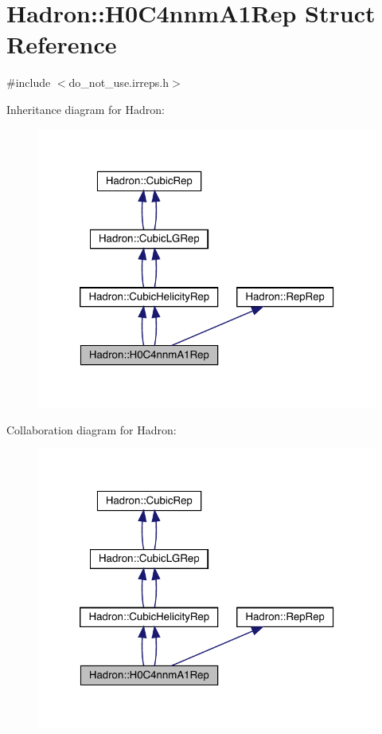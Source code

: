 \hypertarget{structHadron_1_1H0C4nnmA1Rep}{}\section{Hadron\+:\+:H0\+C4nnm\+A1\+Rep Struct Reference}
\label{structHadron_1_1H0C4nnmA1Rep}


{\ttfamily \#include $<$do\+\_\+not\+\_\+use.\+irreps.\+h$>$}



Inheritance diagram for Hadron\+:\nopagebreak
\begin{figure}[H]
\begin{center}
\leavevmode
\includegraphics[width=320pt]{da/d76/structHadron_1_1H0C4nnmA1Rep__inherit__graph}
\end{center}
\end{figure}


Collaboration diagram for Hadron\+:\nopagebreak
\begin{figure}[H]
\begin{center}
\leavevmode
\includegraphics[width=320pt]{d8/d31/structHadron_1_1H0C4nnmA1Rep__coll__graph}
\end{center}
\end{figure}
